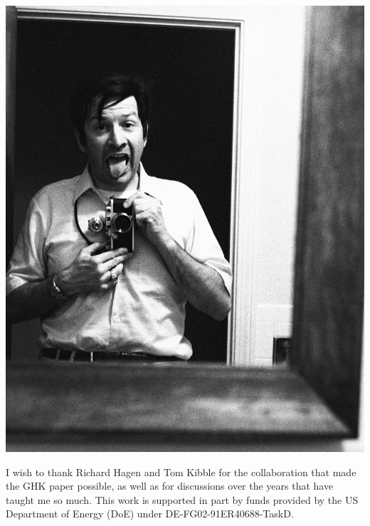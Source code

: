 \documentclass[preprintnumbers,12pt]{revtex4-2}
\begin{document}
\begin{flushright}
  \includegraphics[scale=0.16]{ggt2.jpg}
\end{flushright}
%
%
%
%
\begin{acknowledgments}
I wish to thank Richard Hagen and Tom Kibble for the collaboration that made
the GHK paper possible, as well as for discussions over the years that have
taught me so much. This work is supported in part by funds provided by the US Department
of Energy (\textsf{DoE}) under \textsf{DE-FG02-91ER40688-TaskD}.
\end{acknowledgments}
\end{document}
